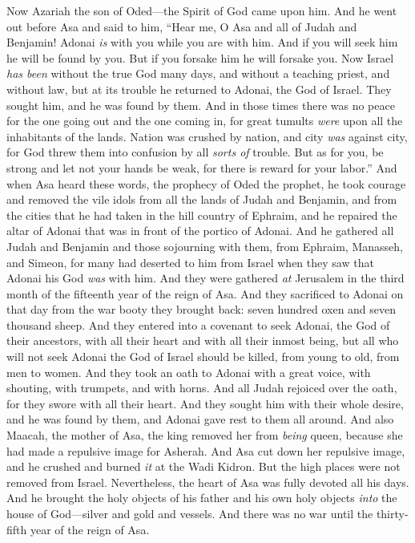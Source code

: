 \begin{biblechapter} %
 Now Azariah the son of Oded—the Spirit of God came upon him.
\verse And he went out before Asa and said to him, “Hear me, O Asa and all of Judah and Benjamin! Adonai \textit{is} with you while you are with him. And if you will seek him he will be found by you. But if you forsake him he will forsake you.
\verse Now Israel \textit{has been} without the true God many days, and without a teaching priest, and without law,
\verse but at its trouble he returned to Adonai, the God of Israel. They sought him, and he was found by them.
\verse And in those times there was no peace for the one going out and the one coming in, for great tumults \textit{were} upon all the inhabitants of the lands.
\verse Nation was crushed by nation, and city \textit{was} against city, for God threw them into confusion by all \textit{sorts of} trouble.
\verse But as for you, be strong and let not your hands be weak, for there is reward for your labor.”
\verse And when Asa heard these words, the prophecy of Oded the prophet, he took courage and removed the vile idols from all the lands of Judah and Benjamin, and from the cities that he had taken in the hill country of Ephraim, and he repaired the altar of Adonai that was in front of the portico of Adonai.
\verse And he gathered all Judah and Benjamin and those sojourning with them, from Ephraim, Manasseh, and Simeon, for many had deserted to him from Israel when they saw that Adonai his God \textit{was} with him.
\verse And they were gathered \textit{at} Jerusalem in the third month of the fifteenth year of the reign of Asa.
\verse And they sacrificed to Adonai on that day from the war booty they brought back: seven hundred oxen and seven thousand sheep.
\verse And they entered into a covenant to seek Adonai, the God of their ancestors, with all their heart and with all their inmost being,
\verse but all who will not seek Adonai the God of Israel should be killed, from young to old, from men to women.
\verse And they took an oath to Adonai with a great voice, with shouting, with trumpets, and with horns.
\verse And all Judah rejoiced over the oath, for they swore with all their heart. And they sought him with their whole desire, and he was found by them, and Adonai gave rest to them all around.
\verse And also Maacah, the mother of Asa, the king removed her from \textit{being} queen, because she had made a repulsive image for Asherah. And Asa cut down her repulsive image, and he crushed and burned \textit{it} at the Wadi Kidron.
\verse But the high places were not removed from Israel. Nevertheless, the heart of Asa was fully devoted all his days.
\verse And he brought the holy objects of his father and his own holy objects \textit{into} the house of God—silver and gold and vessels.
\verse And there was no war until the thirty-fifth year of the reign of Asa.
\end{biblechapter}

